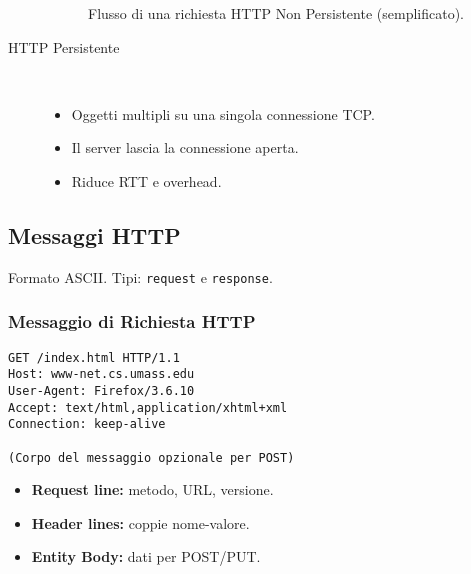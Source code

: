 \begin{description}
\begin{figure}[H]
\caption{Flusso di una richiesta HTTP Non Persistente (semplificato).}
\label{fig:http_non_persistent}
\end{figure}

    \item[HTTP Persistente]\mbox{}\\
    \begin{itemize}
        \item Oggetti multipli su una singola connessione TCP.
        \item Il server lascia la connessione aperta.
        \item Riduce RTT e overhead.
    \end{itemize}
\end{description}

\subsection{Messaggi HTTP}
Formato ASCII. Tipi: \texttt{request} e \texttt{response}.
\subsubsection{Messaggio di Richiesta HTTP}
\begin{verbatim}
GET /index.html HTTP/1.1
Host: www-net.cs.umass.edu
User-Agent: Firefox/3.6.10
Accept: text/html,application/xhtml+xml
Connection: keep-alive

(Corpo del messaggio opzionale per POST)
\end{verbatim}
\begin{itemize}
    \item \textbf{Request line:} metodo, URL, versione.
    \item \textbf{Header lines:} coppie nome-valore.
    \item \textbf{Entity Body:} dati per POST/PUT.
\end{itemize}

